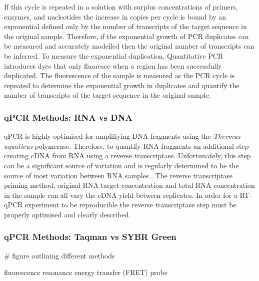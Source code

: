 \documentclass[../main.tex]{subfiles}
\begin{document}
If this cycle is repeated in a solution with surplus concentrations of primers, enzymes, and nucleotides the increase in copies per cycle is bound by an exponential defined only by the number of transcripts of the target sequence in the original sample.
Therefore, if the exponential growth of PCR duplicates can be measured and accurately modelled then the original number of transcripts can be inferred. 
To measure the exponential duplication, Quantitative PCR introduces dyes that only fluoresce when a region has been successfully duplicated. 
The fluorescence of the sample is measured as the PCR cycle is repeated to determine the exponential growth in duplicates and quantify the number of transcripts of the target sequence in the original sample.

\subsubsection{qPCR Methods: RNA vs DNA}

qPCR is highly optimised for amplifiying DNA fragments using the \textit{Thermus aquaticus} polymerase. Therefore, to quantify RNA fragments an additional step creating cDNA from RNA using a reverse transcriptase. Unfortunately, this step can be a significant source of variation and is regularly determined to be the source of most variation between RNA samples \parencite{Stahlberg2004}. The reverse transcriptase priming method, original RNA target concentration and total RNA concentration in the sample can all vary the cDNA yield between replicates. In order for a RT-qPCR experiment to be reproducible the reverse transcriptase step must be properly optimised and clearly described. 

\subsubsection{qPCR Methods: Taqman vs SYBR Green}

# figure outlining different methods


fluorescence resonance energy transfer (FRET) probe
\end{document}
